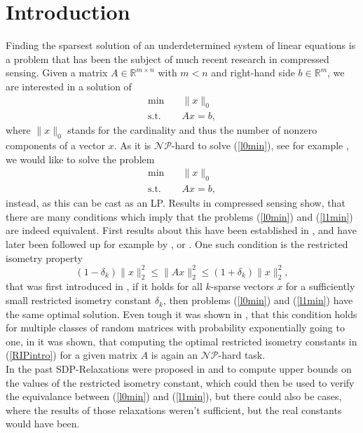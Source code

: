\documentclass{elsarticle}
\newcommand{\R}{\mathds{R}}
\begin{document}
\section{Introduction}
Finding the sparsest solution of an underdetermined system of linear equations is a problem that has been the subject of much recent research in compressed sensing. Given a matrix $A \in \R^{m \times n}$ with $m < n$ and 
right-hand side $b \in \R^m$, we are interested in a solution of 
\begin{align}\label{l0min}
 \text{min} \quad & \|x\|_0 \\
 \text{s.t.} \quad & Ax = b, \nonumber
\end{align}
where $\|x\|_0$ stands for the cardinality and thus the number of nonzero components of a vector $x$. As it is $\mathcal{NP}$-hard to solve (\ref{l0min}), see for example \cite{GareyJohnson}, we would like to solve the problem
\begin{align}\label{l1min}
 \text{min} \quad & \|x\|_0 \\
 \text{s.t.} \quad & Ax = b, \nonumber
\end{align}
instead, as this can be cast as an LP. Results in compressed sensing show, that there are many conditions which imply that the problems (\ref{l0min}) and (\ref{l1min}) are indeed equivalent. First results about this have been 
established in \cite{DH01}, and have later been followed up for example by \cite{CRT05}, \cite{Zha08} or \cite{BCT11}. One such condition is the restricted isometry property
\begin{equation}\label{RIPintro}
 (1-\delta_k)\|x\|_2^2 \leq \|Ax\|_2^2 \leq (1+\delta_k)\|x\|_2^2,
\end{equation}
that was first introduced in \cite{CT05}, if it holds for all $k$-sparse vectors $x$ for a sufficiently small restricted isometry constant $\delta_k$, then problems (\ref{l0min}) and (\ref{l1min}) have the same optimal solution. 
Even tough it was shown in \cite{BDDW08}, that this condition holds for multiple classes of random matrices with probability exponentially going to one, in \cite{PT14} it was shown, that computing the optimal restricted isometry 
constants in (\ref{RIPintro}) for a given matrix $A$ is again an $\mathcal{NP}$-hard task. \\
In the past SDP-Relaxations were proposed in \cite{Asp07} and \cite{Asp08} to compute upper bounds on the values of the restricted isometry 
constant, which could then be used to verify the equivalance between (\ref{l0min}) and (\ref{l1min}), but there could also be cases, where the results of those relaxations weren't sufficient, but the real constants would have been. 
\end{document}
